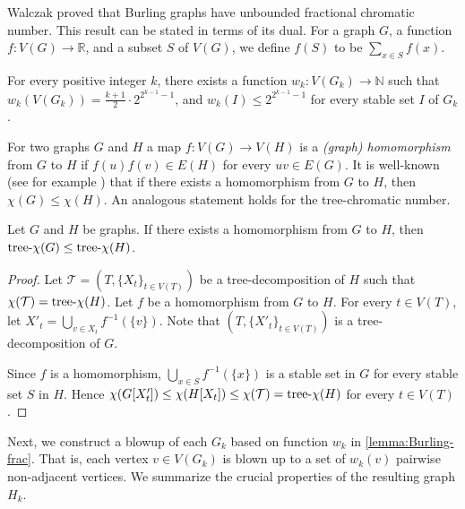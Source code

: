 \documentclass[a4paper, cleveref, autoref, thm-restate]{lipics-v2021}
\newcommand{\T}{\mathcal{T}}
\newcommand{\treex}{{\rm tree}\textnormal{-}\chi}
\begin{document}
Walczak \cite{Wal-15} proved that Burling graphs have unbounded fractional chromatic number.
This result can be stated in terms of its dual.
For a graph $G$, a function $f\colon V(G) \rightarrow {\mathbb R}$, and a subset $S$ of $V(G)$, we define $f(S)$ to be $\sum_{x \in S}f(x)$.

\begin{lemma} \label{lemma:Burling-frac}
    For every positive integer $k$, there exists a function $w_k\colon V(G_k) \rightarrow {\mathbb N}$ such that $w_k(V(G_k)) = \frac{k+1}{2} \cdot 2^{2^{k-1}-1}$, and  $w_k(I) \leq 2^{2^{k-1}-1}$ for every stable set $I$ of $G_k$.
\end{lemma}

For two graphs $G$ and $H$ a map $f \colon V(G) \to V(H)$ is a \emph{(graph) homomorphism} from $G$ to $H$ if $f(u)f(v) \in E(H)$ for every $uv \in E(G)$.
It is well-known (see for example \cite[Corollary 1.8]{HN-04}) that if there exists a homomorphism from $G$ to $H$, then $\chi(G) \leq \chi(H)$.
An analogous statement holds for the tree-chromatic number.

\begin{lemma} \label{lemma:homo-treex}
Let $G$ and $H$ be graphs.
If there exists a homomorphism from $G$ to $H$, then $\treex(G) \leq \treex(H)$.
\end{lemma}

\begin{proof}
Let $\T=(T,\{X_t\}_{t \in V(T)})$ be a tree-decomposition of $H$ such that $\chi(\T)=\treex(H)$.
Let $f$ be a homomorphism from $G$ to $H$.
For every $t \in V(T)$, let $X'_t = \bigcup_{v \in X_t}f^{-1}(\{v\})$.
Note that $(T,\{X'_t\}_{t \in V(T)})$ is a tree-decomposition of $G$.

Since $f$ is a homomorphism, $\bigcup_{x \in S}f^{-1}(\{x\})$ is a stable set in $G$ for every stable set $S$ in $H$.
Hence $\chi(G[X'_t]) \leq \chi(H[X_t]) \leq \chi(\T) = \treex(H)$ for every $t \in V(T)$.
\end{proof}

Next, we construct a blowup of each $G_k$ based on function $w_k$ in \cref{lemma:Burling-frac}.
That is, each vertex $v \in V(G_k)$ is blown up to a set of $w_k(v)$ pairwise non-adjacent vertices.
We summarize the crucial properties of the resulting graph $H_k$.
\end{document}
